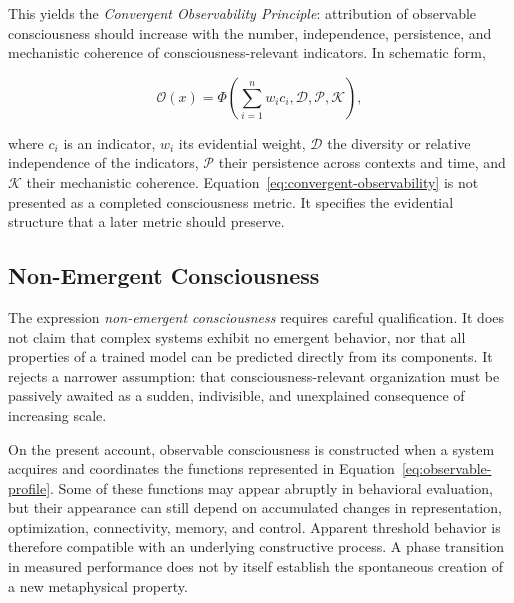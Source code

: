 This yields the \emph{Convergent Observability Principle}: attribution of observable consciousness should increase with the number, independence, persistence, and mechanistic coherence of consciousness-relevant indicators. In schematic form,

\begin{equation}
\mathcal{O}(x)
=
\Phi\!\left(\sum_{i=1}^{n} w_i c_i,
             \mathcal{D},
             \mathcal{P},
             \mathcal{K}\right),
\label{eq:convergent-observability}
\end{equation}

where $c_i$ is an indicator, $w_i$ its evidential weight, $\mathcal{D}$ the diversity or relative independence of the indicators, $\mathcal{P}$ their persistence across contexts and time, and $\mathcal{K}$ their mechanistic coherence. Equation~\ref{eq:convergent-observability} is not presented as a completed consciousness metric. It specifies the evidential structure that a later metric should preserve.

\subsection{Non-Emergent Consciousness}
\label{subsec:non-emergent-consciousness}

The expression \emph{non-emergent consciousness} requires careful qualification. It does not claim that complex systems exhibit no emergent behavior, nor that all properties of a trained model can be predicted directly from its components. It rejects a narrower assumption: that consciousness-relevant organization must be passively awaited as a sudden, indivisible, and unexplained consequence of increasing scale.

On the present account, observable consciousness is constructed when a system acquires and coordinates the functions represented in Equation~\ref{eq:observable-profile}. Some of these functions may appear abruptly in behavioral evaluation, but their appearance can still depend on accumulated changes in representation, optimization, connectivity, memory, and control. Apparent threshold behavior is therefore compatible with an underlying constructive process. A phase transition in measured performance does not by itself establish the spontaneous creation of a new metaphysical property.

